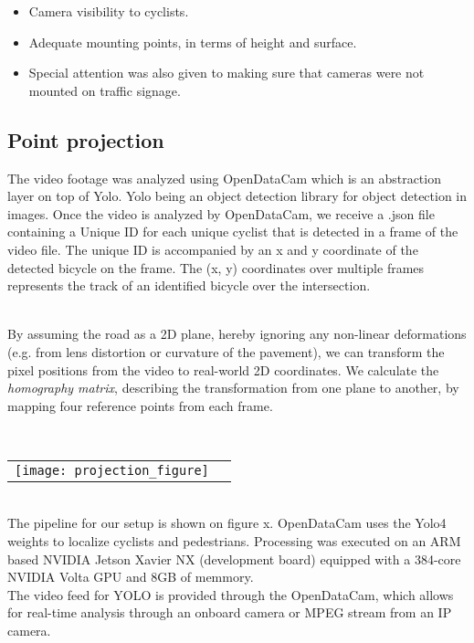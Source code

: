 \documentclass[10pt, a4paper, twocolumn]{article} %
\begin{document}
\begin{itemize}
	\item Camera visibility to cyclists.
	\item Adequate mounting points, in terms of height and surface.
	\item Special attention was also given to making sure that cameras were not mounted on traffic signage.
\end{itemize}

\subsection{Point projection}
The video footage was analyzed using OpenDataCam which is an abstraction layer on top of Yolo. Yolo being an object detection library for object detection in images.
Once the video is analyzed by OpenDataCam, we receive a .json file containing a Unique ID for each unique cyclist that is detected in a frame of the video file. 
The unique ID is accompanied by an x and y coordinate of the detected bicycle on the frame. The (x, y) coordinates over multiple frames represents the track of an identified bicycle over the intersection.

\ \\
By assuming the road as a 2D plane, hereby ignoring any non-linear deformations (e.g. from lens distortion or curvature of the pavement), 
we can transform the pixel positions from the video to real-world 2D coordinates. 
We calculate the \textit{homography matrix}, describing the transformation from one plane to another, by mapping four reference points from each frame.

\raggedbottom

\ \\ 

\noindent
\begin{tabular}{@{}cc}
\texttt{[image: projection\_figure]} 
\end{tabular}

\ \\
The pipeline for our setup is shown on figure x. OpenDataCam uses the Yolo4 weights to localize cyclists and pedestrians.
Processing was executed on an ARM based NVIDIA Jetson Xavier NX (development board) equipped with a 384-core NVIDIA Volta GPU
and 8GB of memmory. 
\\
The video feed for YOLO is provided through the OpenDataCam, which allows for real-time analysis through an onboard camera
or MPEG stream from an IP camera.  
\end{document}
